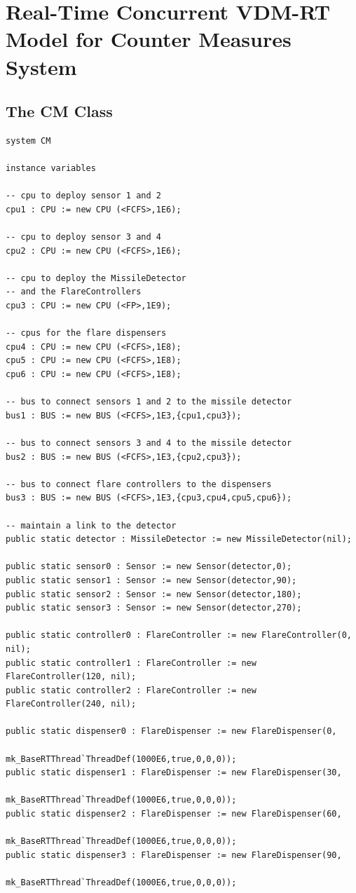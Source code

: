 \documentclass{overturerepchap}
\begin{document}
\section{Real-Time Concurrent VDM-RT Model for Counter Measures System}

\subsection{The CM Class}

\begin{lstlisting}
system CM

instance variables

-- cpu to deploy sensor 1 and 2
cpu1 : CPU := new CPU (<FCFS>,1E6);

-- cpu to deploy sensor 3 and 4
cpu2 : CPU := new CPU (<FCFS>,1E6);

-- cpu to deploy the MissileDetector
-- and the FlareControllers
cpu3 : CPU := new CPU (<FP>,1E9);

-- cpus for the flare dispensers
cpu4 : CPU := new CPU (<FCFS>,1E8);
cpu5 : CPU := new CPU (<FCFS>,1E8);
cpu6 : CPU := new CPU (<FCFS>,1E8);

-- bus to connect sensors 1 and 2 to the missile detector
bus1 : BUS := new BUS (<FCFS>,1E3,{cpu1,cpu3});

-- bus to connect sensors 3 and 4 to the missile detector
bus2 : BUS := new BUS (<FCFS>,1E3,{cpu2,cpu3});
  
-- bus to connect flare controllers to the dispensers
bus3 : BUS := new BUS (<FCFS>,1E3,{cpu3,cpu4,cpu5,cpu6});

-- maintain a link to the detector
public static detector : MissileDetector := new MissileDetector(nil);

public static sensor0 : Sensor := new Sensor(detector,0);
public static sensor1 : Sensor := new Sensor(detector,90);
public static sensor2 : Sensor := new Sensor(detector,180);
public static sensor3 : Sensor := new Sensor(detector,270);

public static controller0 : FlareController := new FlareController(0, nil);
public static controller1 : FlareController := new FlareController(120, nil);
public static controller2 : FlareController := new FlareController(240, nil);

public static dispenser0 : FlareDispenser := new FlareDispenser(0, 
                            mk_BaseRTThread`ThreadDef(1000E6,true,0,0,0));
public static dispenser1 : FlareDispenser := new FlareDispenser(30, 
                            mk_BaseRTThread`ThreadDef(1000E6,true,0,0,0));
public static dispenser2 : FlareDispenser := new FlareDispenser(60, 
                            mk_BaseRTThread`ThreadDef(1000E6,true,0,0,0));
public static dispenser3 : FlareDispenser := new FlareDispenser(90, 
                            mk_BaseRTThread`ThreadDef(1000E6,true,0,0,0));


\end{lstlisting}
\end{document}
